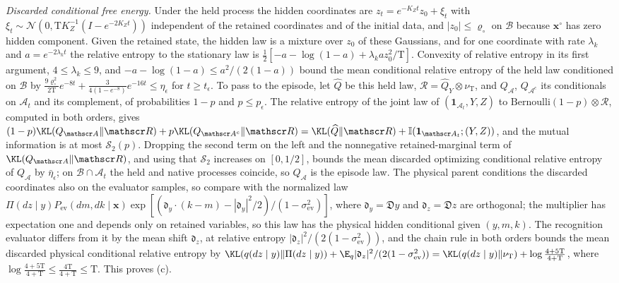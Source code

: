 \emph{Discarded conditional free energy.} Under the held process the hidden
coordinates are \(z_t=e^{-K_Zt}z_0+\xi_t\) with
\(\xi_t\sim\mathcal N(0,\mathrm TK_Z^{-1}(I-e^{-2K_Zt}))\) independent of the
retained coordinates and of the initial data, and \(|z_0|\le\varrho_\circ\) on
\(\mathscr B\) because \(\mathbf x^\circ\) has zero hidden component. Given the
retained state, the hidden law is a mixture over \(z_0\) of these Gaussians,
and for one coordinate with rate \(\lambda_k\) and \(a=e^{-2\lambda_kt}\) the
relative entropy to the stationary law is
\(\tfrac12[-a-\log(1-a)+\lambda_ka z_0^2/\mathrm T]\). Convexity of relative
entropy in its first argument, \(4\le\lambda_k\le9\), and
\(-a-\log(1-a)\le a^2/(2(1-a))\) bound the mean conditional relative entropy of
the held law conditioned on \(\mathscr B\) by
\(\frac{9\varrho_\circ^2}{2\mathrm T}e^{-8t}+\frac{3}{4(1-e^{-8})}e^{-16t}\le\eta_\epsilon\)
for \(t\ge t_\epsilon\). To pass to the episode, let \(\widehat Q\) be this held
law, \(\mathscr R=\widehat Q_Y\otimes\nu_{\mathrm T}\), and \(Q_{\mathscr A}\),
\(Q_{\mathscr A^c}\) its conditionals on \(\mathscr A_t\) and its complement, of
probabilities \(1-p\) and \(p\le p_\epsilon\). The relative entropy of the joint
law of \((\mathbf 1_{\mathscr A_t},Y,Z)\) to
\(\mathrm{Bernoulli}(1-p)\otimes\mathscr R\), computed in both orders, gives
\((1-p)\KL(Q_{\mathscr A}\Vert\mathscr R)+p\KL(Q_{\mathscr A^c}\Vert\mathscr R)
=\KL(\widehat Q\Vert\mathscr R)+\mathbb I(\mathbf 1_{\mathscr A_t};(Y,Z))\), and the
mutual information is at most \(\mathcal S_2(p)\). Dropping the second term on
the left and the nonnegative retained-marginal term of
\(\KL(Q_{\mathscr A}\Vert\mathscr R)\), and using that \(\mathcal S_2\) increases
on \([0,1/2]\), bounds the mean discarded optimizing conditional relative
entropy of \(Q_{\mathscr A}\) by \(\bar\eta_\epsilon\); on
\(\mathscr B\cap\mathscr A_t\) the held and native processes coincide, so
\(Q_{\mathscr A}\) is the episode law. The physical parent conditions the
discarded coordinates also on the evaluator samples, so compare with the
normalized law
\(\Pi(dz\mid y) P_{\mathrm{ev}}(dm,dk\mid\mathbf x)
\exp[(\mathfrak d_y\cdot(k-m)-|\mathfrak d_y|^2/2)/(1-\sigma^2_{\mathrm{ev}})]\),
where \(\mathfrak d_y=\mathfrak Dy\) and \(\mathfrak d_z=\mathfrak Dz\) are
orthogonal; the multiplier has expectation one and depends only on retained
variables, so this law has the physical hidden conditional given
\((y,m,k)\). The recognition evaluator differs from it by the mean shift
\(\mathfrak d_z\), at relative entropy
\(|\mathfrak d_z|^2/(2(1-\sigma^2_{\mathrm{ev}}))\), and the chain rule in both
orders bounds the mean discarded physical conditional relative entropy by
\(\KL(q(dz\mid y)\Vert\Pi(dz\mid y))+\E_q|\mathfrak d_z|^2/(2(1-\sigma^2_{\mathrm{ev}}))
=\KL(q(dz\mid y)\Vert\nu_{\mathrm T})+\log\frac{4+5\mathrm T}{4+\mathrm T}\), where
\(\log\frac{4+5\mathrm T}{4+\mathrm T}\le\frac{4\mathrm T}{4+\mathrm T}\le\mathrm T\).
This proves (c).

